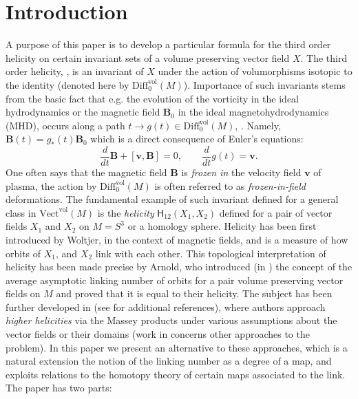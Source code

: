 \documentclass[12pt]{article}
\newcommand{\no}{\noindent}
\begin{document}
\section{Introduction}
 A purpose of this paper is to develop a particular formula for the third order helicity on certain  invariant sets of a volume preserving vector field $X$. The third order helicity, \cite{Khesin98}, is an invariant of $X$ under the action of volumorphisms isotopic to the identity (denoted here by $\text{Diff}^\text{vol}_0(M)$).  
\no Importance of such invariants stems from the basic fact that e.g. the evolution of the vorticity in the ideal hydrodynamics or the magnetic field $\mathbf{B}_0$ in the ideal magnetohydrodynamics (MHD), occurs along a path $t\longrightarrow g(t)\in \text{Diff}^\text{vol}_0(M)$, \cite[p. 176]{Khesin98}. Namely,
$\mathbf{B}(t)=g_\ast(t)\mathbf{B}_0$ which is a direct consequence of Euler's equations: 
\begin{equation}\label{eq:Eulers-eq}
\frac{d}{dt} \mathbf{B}+[\mathbf{v},\mathbf{B}]=0,\qquad \frac{d}{dt} g(t)=\mathbf{v} .
\end{equation}
 One often says that the magnetic field $\mathbf{B}$ is \emph{frozen in} the velocity field $\mathbf{v}$ of plasma, the action by $\text{Diff}^\text{vol}_0(M)$ is often referred to as \emph{frozen-in-field} deformations. The fundamental example of such invariant defined for a general class in $\text{Vect}^\text{vol}(M)$ is the \emph{helicity} $\mathsf{H}_{12}(X_1,X_2)$ defined for a pair of vector fields $X_1$ and $X_2$ on $M=S^3$ or a homology sphere. 
Helicity has been first introduced by Woltjer, in the context of magnetic fields, and is a measure of how orbits of $X_1$, and $X_2$ link with each other. This topological interpretation of helicity has been made precise by Arnold, who introduced (in  \cite{Arnold86}) the concept of the average asymptotic linking number of orbits for a pair volume preserving vector fields on $M$ and proved that it is equal to their helicity. 
The subject has been further developed 
in \cite{Berger90, Akhmetiev05, Hornig04, Laurence-Stredulinsky00b} (see \cite{Khesin98} for additional references), where authors approach \emph{higher helicities} via the Massey products under various assumptions about the vector fields or their domains (work in \cite{Gambaudo-Ghys97, Verjovsky94} concerns other approaches to the problem). In this paper we present an alternative to these approaches, which is a natural extension the notion of the linking number as a degree of a map, and exploits relations to the homotopy theory of certain maps associated to the link. The paper has two parts:
\end{document}
